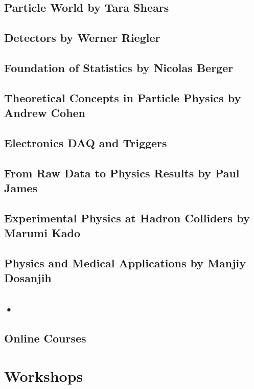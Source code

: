 \documentclass{article}
\begin{document}
\subsection{Particle World by Tara Shears}
\subsection{Detectors by Werner Riegler}
\subsection{Foundation of Statistics by Nicolas Berger}
\subsection{Theoretical Concepts in Particle Physics by Andrew Cohen}
\subsection{Electronics DAQ and Triggers}
\subsection{From Raw Data to Physics Results by Paul James}
\subsection{Experimental Physics at Hadron Colliders by Marumi Kado}
\subsection{Physics and Medical Applications by Manjiy Dosanjih}
\subsection{•}

\subsection{Online Courses}


\section{Workshops}
\end{document}
